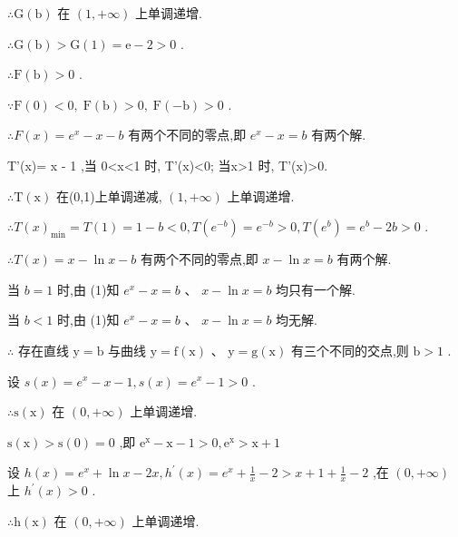 \documentclass[10pt]{article}
\begin{document}
\(\therefore \mathrm{G}\left( \mathrm{b}\right)\) 在 \(\left( {1, + \infty }\right)\) 上单调递增.

\(\therefore \mathrm{G}\left( \mathrm{b}\right)  > \mathrm{G}\left( 1\right)  = \mathrm{e} - 2 > 0\) .

\(\therefore \mathrm{F}\left( \mathrm{b}\right)  > 0\) .

\(\because \mathrm{F}\left( 0\right)  < 0,\mathrm{\;F}\left( \mathrm{b}\right)  > 0,\mathrm{\;F}\left( {-\mathrm{b}}\right)  > 0\) .

\(\therefore F\left( x\right)  = {e}^{x} - x - b\) 有两个不同的零点,即 \({e}^{x} - x = b\) 有两个解.

T'(x)= x - 1 ,当 0<x<1 时, T'(x)<0; 当x>1 时, T'(x)>0.

\(\therefore \mathrm{T}\left( \mathrm{x}\right)\) 在(0,1)上单调递减, \(\left( {1, + \infty }\right)\) 上单调递增.

\(\therefore T{\left( x\right) }_{\min } = T\left( 1\right)  = 1 - b < 0,T\left( {e}^{-b}\right)  = {e}^{-b} > 0,T\left( {e}^{b}\right)  = {e}^{b} - {2b} > 0\) .

\(\therefore T\left( x\right)  = x - \ln x - b\) 有两个不同的零点,即 \(x - \ln x = b\) 有两个解.

当 \(b = 1\) 时,由 (1)知 \({e}^{x} - x = b\text{ 、 }x - \ln x = b\) 均只有一个解.

当 \(b < 1\) 时,由 (1)知 \({e}^{x} - x = b\text{ 、 }x - \ln x = b\) 均无解.

\(\therefore\) 存在直线 \(\mathrm{y} = \mathrm{b}\) 与曲线 \(\mathrm{y} = \mathrm{f}\left( \mathrm{x}\right) \text{ 、 }\mathrm{y} = \mathrm{g}\left( \mathrm{x}\right)\) 有三个不同的交点,则 \(\mathrm{b} > 1\) .

设 \(s\left( x\right)  = {e}^{x} - x - 1,s\left( x\right)  = {e}^{x} - 1 > 0\) .

\(\therefore \mathrm{s}\left( \mathrm{x}\right)\) 在 \(\left( {0, + \infty }\right)\) 上单调递增.

\(\mathrm{s}\left( \mathrm{x}\right)  > \mathrm{s}\left( 0\right)  = 0\) ,即 \({\mathrm{e}}^{\mathrm{x}} - \mathrm{x} - 1 > 0,{\mathrm{e}}^{\mathrm{x}} > \mathrm{x} + 1\)

设 \(h\left( x\right)  = {e}^{x} + \ln x - {2x},{h}^{\prime }\left( x\right)  = {e}^{x} + \frac{1}{x} - 2 > x + 1 + \frac{1}{x} - 2\) ,在 \(\left( {0, + \infty }\right)\) 上 \({h}^{\prime }\left( x\right)  > 0\) .

\(\therefore \mathrm{h}\left( \mathrm{x}\right)\) 在 \(\left( {0, + \infty }\right)\) 上单调递增.
\end{document}
